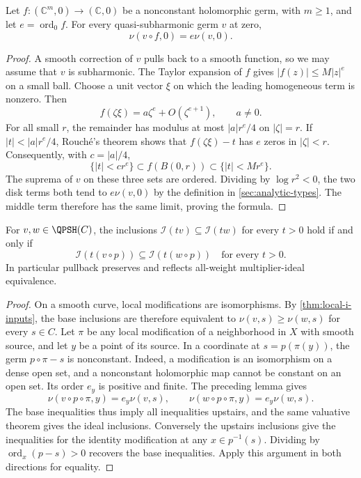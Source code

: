 \begin{lemma}\label{curve-map:lelong-pullback}
Let $f:(\mathbb C^m,0)\to(\mathbb C,0)$ be a nonconstant
holomorphic germ, with $m\geq1$, and let $e=\operatorname{ord}_0f$.
For every quasi-subharmonic germ $v$ at zero,
\[
 \nu(v\circ f,0)=e\nu(v,0).
\]
\end{lemma}
\begin{proof}
A smooth correction of $v$ pulls back to a smooth function, so
we may assume that $v$ is subharmonic. The Taylor expansion of
$f$ gives $|f(z)|\leq M|z|^e$ on a small ball. Choose a unit vector
$\xi$ on which the leading homogeneous term is nonzero. Then
\[
 f(\zeta\xi)=a\zeta^e+O(\zeta^{e+1}),\qquad a\ne0.
\]
For all small $r$, the remainder has modulus at most
$|a|r^e/4$ on $|\zeta|=r$. If $|t|<|a|r^e/4$, Rouch\'e's theorem
shows that $f(\zeta\xi)-t$ has $e$ zeros in $|\zeta|<r$.
Consequently, with $c=|a|/4$,
\[
 \{|t|<cr^e\}\subset f(B(0,r))
                  \subset\{|t|<Mr^e\}.
\]
The suprema of $v$ on these three sets are ordered. Dividing
by $\log r^2<0$, the two disk terms both tend to $e\nu(v,0)$
by the definition in \cref{sec:analytic-types}. The middle term
therefore has the same limit, proving the formula.
\end{proof}

\begin{corollary}\label{curve-map:ideal-types}
For $v,w\in\QPSH(C)$, the inclusions
$\mathcal I(tv)\subseteq\mathcal I(tw)$ for every $t>0$ hold
if and only if
\[
 \mathcal I(t(v\circ p))\subseteq\mathcal I(t(w\circ p))
 \quad\text{for every }t>0.
\]
In particular pullback preserves and reflects all-weight
multiplier-ideal equivalence.
\end{corollary}
\begin{proof}
On a smooth curve, local modifications are isomorphisms.
By \cref{thm:local-i-inputs}, the base inclusions are therefore
equivalent to $\nu(v,s)\geq\nu(w,s)$ for every $s\in C$.
Let $\pi$ be any local modification of a neighborhood in $X$
with smooth source, and let $y$ be a point of its source.
In a coordinate at $s=p(\pi(y))$, the germ $p\circ\pi-s$ is
nonconstant. Indeed, a modification is an isomorphism on a
dense open set, and a nonconstant holomorphic map cannot be
constant on an open set. Its order $e_y$ is positive and finite.
The preceding lemma gives
\[
 \nu(v\circ p\circ\pi,y)=e_y\nu(v,s),\qquad
 \nu(w\circ p\circ\pi,y)=e_y\nu(w,s).
\]
The base inequalities thus imply all inequalities upstairs,
and the same valuative theorem gives the ideal inclusions.
Conversely the upstairs inclusions give the inequalities for
the identity modification at any $x\in p^{-1}(s)$. Dividing by
$\operatorname{ord}_x(p-s)>0$ recovers the base inequalities.
Apply this argument in both directions for equality.
\end{proof}

